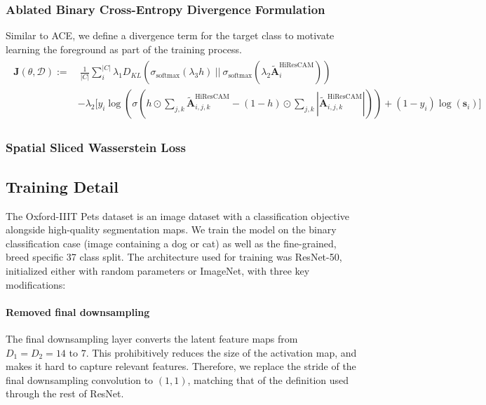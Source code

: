 \documentclass{article}
\theoremstyle{plain}
\theoremstyle{definition}
\theoremstyle{remark}
\begin{document}
\subsubsection{Ablated Binary Cross-Entropy Divergence Formulation}

Similar to ACE, we define a divergence term for the target class to motivate learning the foreground as part of the training process.
\begin{gather}
	\begin{split}
		\mathcal{\bm{J}}(\theta, \mathcal{D}) := &\ \frac{1}{|C|} \sum^{|C|}_{i} \lambda_1 D_{KL}(\sigma_{\text{softmax}}(\lambda_3 h)\ ||\ \sigma_{\text{softmax}}(\lambda_2 \tilde{\mathcal{\bm{A}}}_{i}^{\text{HiResCAM}})) \\
		&- \lambda_2 \bigg[ y_i \log \left(\sigma\left(h \odot \sum_{j,k}\tilde{\mathcal{\bm{A}}}_{i,j,k}^{\text{HiResCAM}} - (1-h) \odot \sum_{j,k}|\tilde{\mathcal{\bm{A}}}_{i,j,k}^{\text{HiResCAM}}|\right) \right) + (1 - y_i) \log \left( \bm{s}_i \right) \bigg]
	\end{split}
\end{gather}

\subsubsection{Spatial Sliced Wasserstein Loss}


\subsection{Training Detail}


The Oxford-IIIT Pets dataset is an image dataset with a classification objective alongside high-quality segmentation maps. We train the model on the binary classification case (image containing a dog or cat) as well as the fine-grained, breed specific 37 class split. The architecture used for training was ResNet-50, initialized either with random parameters or ImageNet, with three key modifications:

\paragraph{Removed final downsampling} The final downsampling layer converts the latent feature maps from $D_1 = D_2 = 14$ to $7$. This prohibitively reduces the size of the activation map, and makes it hard to capture relevant features. Therefore, we replace the stride of the final downsampling convolution to $(1,1)$, matching that of the definition used through the rest of ResNet. 
\end{document}
